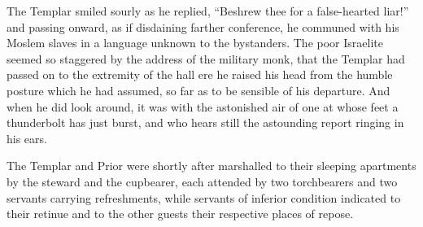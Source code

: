The Templar smiled sourly as he replied, ``Beshrew thee for a
false-hearted liar!'' and passing onward, as if disdaining farther
conference, he communed with his Moslem slaves in a language unknown to
the bystanders. The poor Israelite seemed so staggered by the address of
the military monk, that the Templar had passed on to the extremity of
the hall ere he raised his head from the humble posture which he had
assumed, so far as to be sensible of his departure. And when he did look
around, it was with the astonished air of one at whose feet a
thunderbolt has just burst, and who hears still the astounding report
ringing in his ears.

The Templar and Prior were shortly after marshalled to their sleeping
apartments by the steward and the cupbearer, each attended by two
torchbearers and two servants carrying refreshments, while servants of
inferior condition indicated to their retinue and to the other guests
their respective places of repose.
